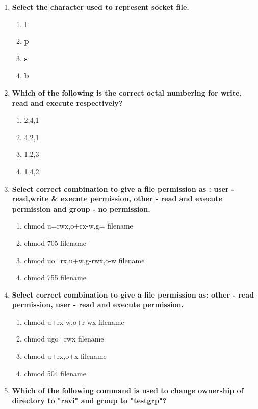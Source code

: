 \begin{flushleft}
\begin{enumerate}
		
		\item \textbf{Select the character used to represent socket file.}
		\begin{enumerate}[label=(\alph*)]
			\item \textbf{l}   
			\item \textbf{p}
			\item \textbf{s}  %
			\item \textbf{b}  
		\end{enumerate}
		\bigskip
		\bigskip
		\item \textbf{Which of the following is the correct octal numbering for write, read and execute respectively?}
		\begin{enumerate}[label=(\alph*)]
			\item 2,4,1  %
			\item 4,2,1   
			\item 1,2,3
			\item 1,4,2
		\end{enumerate}
		\bigskip
		\bigskip
		\item \textbf{Select correct combination to give a file permission as : user - read,write \& execute permission, other - read and execute permission and group - no permission.}
		\begin{enumerate}[label=(\alph*)]
			\item chmod u=rwx,o+rx-w,g=  filename  %
			\item chmod 705 filename  %
			\item chmod uo=rx,u+w,g-rwx,o-w filename   %
			\item chmod 755 filename
		\end{enumerate}
		\bigskip
		\bigskip
		\item \textbf{Select correct combination to give a file permission as: other - read permission, user - read and execute permission.}
		\begin{enumerate}[label=(\alph*)]
			\item chmod u+rx-w,o+r-wx  filename     %
			\item chmod ugo=rwx  filename 
			\item chmod u+rx,o+x  filename
			\item chmod 504 filename
		\end{enumerate}
		\bigskip
		\bigskip
		\item \textbf{Which of the following command is used to change ownership of directory to "ravi" and group to "testgrp"?}
		\begin{enumerate}[label=(\alph*)]

\end{enumerate}
\end{enumerate}
\end{flushleft}
